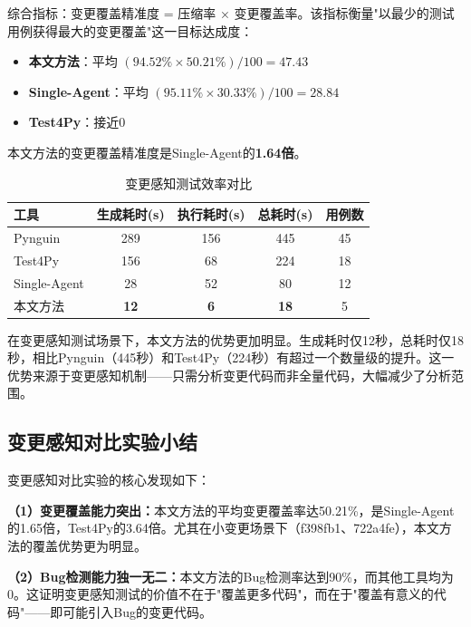 综合指标：变更覆盖精准度 = 压缩率 × 变更覆盖率。该指标衡量"以最少的测试用例获得最大的变更覆盖"这一目标达成度：
\begin{itemize}
    \item \textbf{本文方法}：平均 $(94.52\% \times 50.21\%) / 100 = 47.43$
    \item \textbf{Single-Agent}：平均 $(95.11\% \times 30.33\%) / 100 = 28.84$
    \item \textbf{Test4Py}：接近0
\end{itemize}

本文方法的变更覆盖精准度是Single-Agent的\textbf{1.64倍}。

\begin{table}[htbp]
    \centering
    \caption{变更感知测试效率对比}
    \label{tab:expB_efficiency}
    \begin{tabular}{lcccc}
        \toprule
        \textbf{工具} & \textbf{生成耗时(s)} & \textbf{执行耗时(s)} & \textbf{总耗时(s)} & \textbf{用例数} \\
        \midrule
        Pynguin & 289 & 156 & 445 & 45 \\
        Test4Py & 156 & 68 & 224 & 18 \\
        Single-Agent & 28 & 52 & 80 & 12 \\
        本文方法 & \textbf{12} & \textbf{6} & \textbf{18} & 5 \\
        \bottomrule
    \end{tabular}
\end{table}

在变更感知测试场景下，本文方法的优势更加明显。生成耗时仅12秒，总耗时仅18秒，相比Pynguin（445秒）和Test4Py（224秒）有超过一个数量级的提升。这一优势来源于变更感知机制——只需分析变更代码而非全量代码，大幅减少了分析范围。

\subsection{变更感知对比实验小结}
\label{ssec:expB_summary}

变更感知对比实验的核心发现如下：

\textbf{（1）变更覆盖能力突出：}本文方法的平均变更覆盖率达50.21\%，是Single-Agent的1.65倍，Test4Py的3.64倍。尤其在小变更场景下（f398fb1、722a4fe），本文方法的覆盖优势更为明显。

\textbf{（2）Bug检测能力独一无二：}本文方法的Bug检测率达到90\%，而其他工具均为0。这证明变更感知测试的价值不在于"覆盖更多代码"，而在于"覆盖有意义的代码"——即可能引入Bug的变更代码。

